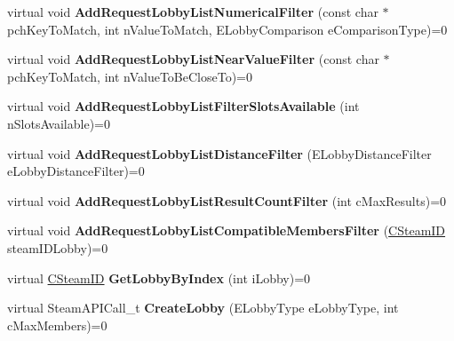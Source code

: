 \begin{DoxyCompactItemize}
\item 
\mbox{\label{class_i_steam_matchmaking_a9b3409ec2ef08baaeb025009def84acd}} 
virtual void {\bfseries Add\+Request\+Lobby\+List\+Numerical\+Filter} (const char $\ast$pch\+Key\+To\+Match, int n\+Value\+To\+Match, E\+Lobby\+Comparison e\+Comparison\+Type)=0
\item 
\mbox{\label{class_i_steam_matchmaking_a6977bdd1ce695749985c61668c3e4758}} 
virtual void {\bfseries Add\+Request\+Lobby\+List\+Near\+Value\+Filter} (const char $\ast$pch\+Key\+To\+Match, int n\+Value\+To\+Be\+Close\+To)=0
\item 
\mbox{\label{class_i_steam_matchmaking_a9575334e8b8368a4d4ac15174bc251ca}} 
virtual void {\bfseries Add\+Request\+Lobby\+List\+Filter\+Slots\+Available} (int n\+Slots\+Available)=0
\item 
\mbox{\label{class_i_steam_matchmaking_a3531dd34afff30653f000770a8b5ba67}} 
virtual void {\bfseries Add\+Request\+Lobby\+List\+Distance\+Filter} (E\+Lobby\+Distance\+Filter e\+Lobby\+Distance\+Filter)=0
\item 
\mbox{\label{class_i_steam_matchmaking_a7af4082331b6a35ceee7450c7b00f21f}} 
virtual void {\bfseries Add\+Request\+Lobby\+List\+Result\+Count\+Filter} (int c\+Max\+Results)=0
\item 
\mbox{\label{class_i_steam_matchmaking_aa2bcffc943566ee3c03b593cca4e0a22}} 
virtual void {\bfseries Add\+Request\+Lobby\+List\+Compatible\+Members\+Filter} (\hyperlink{class_c_steam_i_d}{C\+Steam\+ID} steam\+I\+D\+Lobby)=0
\item 
\mbox{\label{class_i_steam_matchmaking_ae22f461db3ff301594791b0171ed3631}} 
virtual \hyperlink{class_c_steam_i_d}{C\+Steam\+ID} {\bfseries Get\+Lobby\+By\+Index} (int i\+Lobby)=0
\item 
\mbox{\label{class_i_steam_matchmaking_a2c291ead7d67a5df0cceb77a88a6d0a9}} 
virtual Steam\+A\+P\+I\+Call\+\_\+t {\bfseries Create\+Lobby} (E\+Lobby\+Type e\+Lobby\+Type, int c\+Max\+Members)=0
\item 

\end{DoxyCompactItemize}
